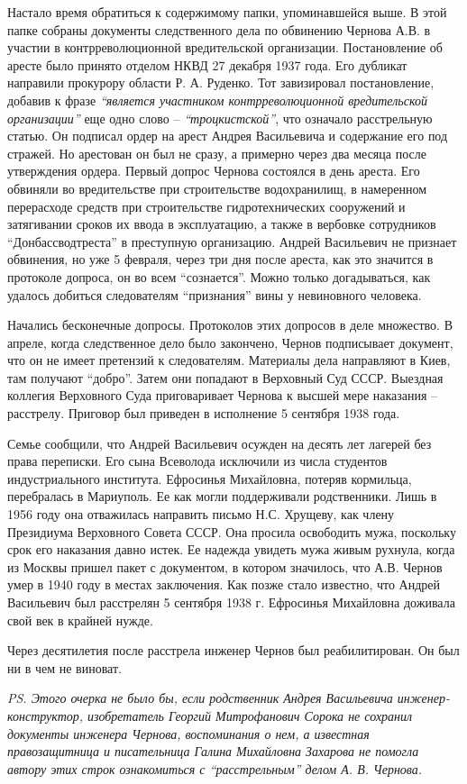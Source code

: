 Настало время обратиться к содержимому папки, упоминавшейся выше. В этой папке
собраны документы следственного дела по обвинению Чернова А.В. в участии в
контрреволюционной вредительской организации. Постановление об аресте было
принято отделом НКВД 27 декабря 1937 года. Его дубликат направили прокурору
области Р. А. Руденко. Тот завизировал постановление, добавив к фразе \emph{\enquote{является
участником контрреволюционной вредительской организации}} еще одно слово –
\emph{\enquote{троцкистской}}, что означало расстрельную статью. Он подписал ордер на арест
Андрея Васильевича и содержание его под стражей. Но арестован он был не сразу,
а примерно через два месяца после утверждения ордера. Первый допрос Чернова
состоялся в день ареста. Его обвиняли во вредительстве при строительстве
водохранилищ, в намеренном перерасходе средств при строительстве
гидротехнических сооружений и затягивании сроков их ввода в эксплуатацию, а
также в вербовке сотрудников \enquote{Донбассводтреста} в преступную организацию.
Андрей Васильевич не признает обвинения, но уже 5 февраля, через три дня после
ареста, как это значится в протоколе допроса, он во всем \enquote{сознается}. Можно
только догадываться, как удалось добиться следователям \enquote{признания} вины у
невиновного человека.

Начались бесконечные допросы. Протоколов этих допросов в деле множество. В
апреле, когда следственное дело было закончено, Чернов подписывает документ,
что он не имеет претензий к следователям. Материалы дела направляют в Киев, там
получают \enquote{добро}. Затем они попадают в Верховный Суд СССР. Выездная коллегия
Верховного Суда приговаривает Чернова к высшей мере наказания – расстрелу.
Приговор был приведен в исполнение 5 сентября 1938 года.

Семье сообщили, что Андрей Васильевич осужден на десять лет лагерей без права
переписки. Его сына Всеволода исключили из числа студентов индустриального
института. Ефросинья Михайловна, потеряв кормильца, перебралась в Мариуполь. Ее
как могли поддерживали родственники. Лишь в 1956 году она отважилась направить
письмо Н.С. Хрущеву, как члену Президиума Верховного Совета СССР. Она просила
освободить мужа, поскольку срок его наказания давно истек. Ее надежда увидеть
мужа живым рухнула, когда из Москвы пришел пакет с документом, в котором
значилось, что А.В. Чернов умер в 1940 году в местах заключения. Как позже
стало известно, что Андрей Васильевич был расстрелян 5 сентября 1938 г.
Ефросинья Михайловна доживала свой век в крайней нужде.

Через десятилетия после расстрела инженер Чернов был реабилитирован. Он был ни
в чем не виноват.

\emph{PS. Этого очерка не было бы, если родственник Андрея Васильевича
инженер-конструктор, изобретатель Георгий Митрофанович Сорока не сохранил
документы инженера Чернова, воспоминания о нем, а известная правозащитница и
писательница Галина Михайловна Захарова не помогла автору этих строк
ознакомиться с \enquote{расстрельным} делом А. В. Чернова.}
